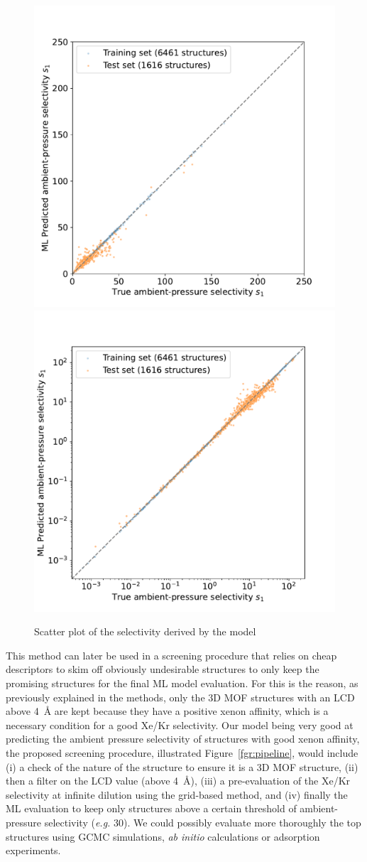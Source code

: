 \documentclass[main]{subfiles}
\begin{document}
\begin{figure}[ht]
  \centering
    \includegraphics[width=0.48\linewidth]{figures/4-ml/SI_figure/Scatterplot_S1_prediction.pdf}
    \includegraphics[width=0.48\linewidth]{figures/4-ml/SI_figure/Scatterplot_S1_prediction_logscale.pdf}
    \caption{Scatter plot of the selectivity derived by the model}\label{fgr:S1_prediction}
  \end{figure}

This method can later be used in a screening procedure that relies on cheap descriptors to skim off obviously undesirable structures to only keep the promising structures for the final ML model evaluation. For this is the reason, as previously explained in the methods, only the 3D MOF structures with an LCD above \SI{4}{\angstrom} are kept because they have a positive xenon affinity, which is a necessary condition for a good Xe/Kr selectivity. Our model being very good at predicting the ambient pressure selectivity of structures with good xenon affinity, the proposed screening procedure, illustrated Figure~\ref{fgr:pipeline}, would include (i) a check of the nature of the structure to ensure it is a 3D MOF structure, (ii) then a filter on the LCD value (above \SI{4}{\angstrom}), (iii) a pre-evaluation of the Xe/Kr selectivity at infinite dilution using the grid-based method, and (iv) finally the ML evaluation to keep only structures above a certain threshold of ambient-pressure selectivity (\emph{e.g.} 30). We could possibly evaluate more thoroughly the top structures using GCMC simulations, \emph{ab initio} calculations or adsorption experiments.
\end{document}
